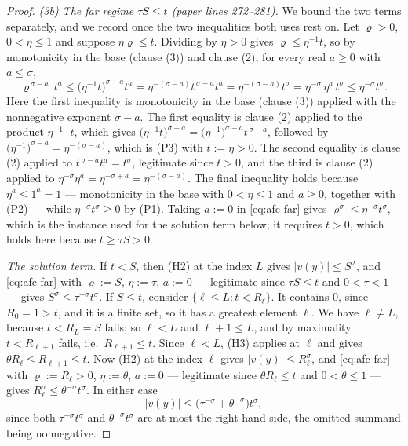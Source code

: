 \begin{proof}
\emph{(3b) The far regime $\tau S\le t$ (paper lines 272--281).}  We bound the two terms
separately, and we record once the two inequalities both uses rest on.  Let $\varrho>0$,
$0<\eta\le1$ and suppose $\eta\varrho\le t$.  Dividing by $\eta>0$ gives
$\varrho\le\eta^{-1}t$, so by monotonicity in the base (clause (3)) and clause (2), for every
real $a\ge0$ with $a\le\sigma$,
\begin{equation}\label{eq:afc-far}
  \varrho^{\,\sigma-a}\,t^{a}\le\bigl(\eta^{-1}t\bigr)^{\sigma-a}t^{a}
  =\eta^{-(\sigma-a)}t^{\,\sigma-a}t^{a}=\eta^{-(\sigma-a)}t^{\sigma}
  =\eta^{-\sigma}\,\eta^{a}\,t^{\sigma}\le\eta^{-\sigma}t^{\sigma}.
\end{equation}
Here the first inequality is monotonicity in the base (clause (3)) applied with the nonnegative
exponent $\sigma-a$.  The first equality is clause (2) applied to the product
$\eta^{-1}\cdot t$, which gives
$\bigl(\eta^{-1}t\bigr)^{\sigma-a}=\bigl(\eta^{-1}\bigr)^{\sigma-a}t^{\,\sigma-a}$, followed by
$\bigl(\eta^{-1}\bigr)^{\sigma-a}=\eta^{-(\sigma-a)}$, which is (P3) with $t:=\eta>0$.  The
second equality is clause (2) applied to $t^{\,\sigma-a}t^{a}=t^{\sigma}$, legitimate since
$t>0$, and the third is clause (2) applied to
$\eta^{-\sigma}\eta^{a}=\eta^{-\sigma+a}=\eta^{-(\sigma-a)}$.  The final inequality holds
because $\eta^{a}\le1^{a}=1$ --- monotonicity in the base with $0<\eta\le1$ and $a\ge0$,
together with (P2) --- while $\eta^{-\sigma}t^{\sigma}\ge0$ by (P1).  Taking $a:=0$ in \eqref{eq:afc-far} gives
$\varrho^{\sigma}\le\eta^{-\sigma}t^{\sigma}$, which is the instance used for the solution term
below; it requires $t>0$, which holds here because $t\ge\tau S>0$.

\emph{The solution term.}  If $t<S$, then (H2) at the index $L$ gives $\lvert v(y)\rvert\le
S^{\sigma}$, and \eqref{eq:afc-far} with $\varrho:=S$, $\eta:=\tau$, $a:=0$ --- legitimate since
$\tau S\le t$ and $0<\tau<1$ --- gives $S^{\sigma}\le\tau^{-\sigma}t^{\sigma}$.  If $S\le t$,
consider $\{\ell\le L:t<R_\ell\}$.  It contains $0$, since $R_0=1>t$, and it is a finite set, so
it has a greatest element $\ell$.  We have $\ell\ne L$, because $t<R_L=S$ fails; so $\ell<L$ and
$\ell+1\le L$, and by maximality $t<R_{\ell+1}$ fails, i.e.\ $R_{\ell+1}\le t$.  Since
$\ell<L$, (H3) applies at $\ell$ and gives $\theta R_\ell\le R_{\ell+1}\le t$.  Now (H2) at the
index $\ell$ gives $\lvert v(y)\rvert\le R_\ell^{\sigma}$, and \eqref{eq:afc-far} with
$\varrho:=R_\ell>0$, $\eta:=\theta$, $a:=0$ --- legitimate since $\theta R_\ell\le t$ and
$0<\theta\le1$ --- gives $R_\ell^{\sigma}\le\theta^{-\sigma}t^{\sigma}$.  In either case
\begin{equation}\label{eq:afc-sol}
  \lvert v(y)\rvert\le\bigl(\tau^{-\sigma}+\theta^{-\sigma}\bigr)t^{\sigma},
\end{equation}
since both $\tau^{-\sigma}t^{\sigma}$ and $\theta^{-\sigma}t^{\sigma}$ are at most the
right-hand side, the omitted summand being nonnegative.


\end{proof}
